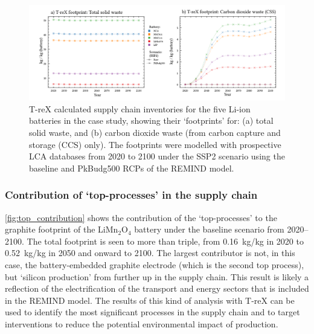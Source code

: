 \documentclass[a4paper,fleqn]{cas-dc}
\begin{document}
\begin{figure}[htbp]
	\centering
	\includegraphics[width=16cm]{figs/T-reX-wastefootprint-totalANDcarbon.pdf}
	\caption{T-reX calculated supply chain inventories for the five Li-ion batteries in the case study, showing their `footprints' for: (a) total solid waste, and (b) carbon dioxide waste (from carbon capture and storage (CCS) only). The footprints were modelled with prospective LCA databases from 2020 to 2100 under the SSP2 scenario using the baseline and PkBudg500 RCPs of the REMIND model.}\label{fig:waste_totalANDcarbon}
\end{figure}

\subsubsection{Contribution of `top-processes' in the supply chain}%

\autoref{fig:top_contribution} shows the contribution of the `top-processes' to the graphite footprint of the  LiMn\(_2\)O\(_4\) battery under the baseline scenario from 2020--2100. The total footprint is seen to more than triple, from 0.16~kg/kg in 2020 to 0.52~kg/kg in 2050 and onward to 2100. The largest contributor is not, in this case, the battery-embedded graphite electrode (which is the second top process), but `silicon production' from further up in the supply chain. This result is likely a reflection of the electrification of the transport and energy sectors that is included in the REMIND model. The results of this kind of analysis with T-reX can be used to identify the most significant processes in the supply chain and to target interventions to reduce the potential environmental impact of production.
\end{document}
